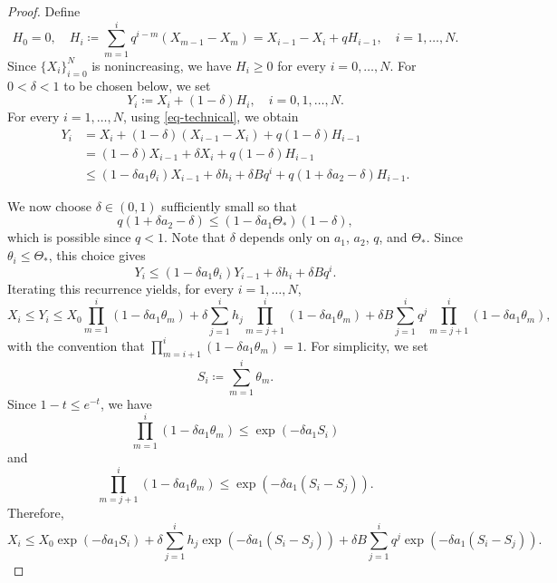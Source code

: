 \documentclass[10pt,a4paper]{amsart}
\begin{document}
\begin{proof}
Define
    \begin{equation*}
        H_0=0, \quad H_i \coloneqq \sum_{m=1}^iq^{i-m}(X_{m-1}-X_m)=X_{i-1}-X_i+qH_{i-1}, \quad i=1,\dots, N.
    \end{equation*}
Since $\{X_i\}_{i=0}^N$ is nonincreasing, we have $H_i \geq 0$ for every $i=0, \dots, N$. For $0<\delta<1$ to be chosen below, we set
    \begin{equation*}
        Y_i \coloneqq X_i+(1-\delta)H_i, \quad i=0, 1, \dots, N.
    \end{equation*}
For every $i=1, \dots, N$, using \eqref{eq-technical}, we obtain
    \begin{equation*}
    \begin{aligned}
        Y_i&=X_i+(1-\delta)(X_{i-1}-X_i)+q(1-\delta)H_{i-1}\\
        &=(1-\delta)X_{i-1}+\delta X_i+q(1-\delta)H_{i-1}\\
        &\leq (1-\delta a_1 \theta_i)X_{i-1}+\delta h_i+\delta B q^i+q(1+\delta a_2-\delta)H_{i-1}.
    \end{aligned}
    \end{equation*}


    We now choose $\delta \in (0, 1)$ sufficiently small so that
    \begin{equation*}
        q(1+\delta a_2-\delta) \leq (1-\delta a_1\Theta_{\ast})(1-\delta),
    \end{equation*}
    which is possible since $q<1$. Note that $\delta$ depends only on $a_1$, $a_2$, $q$, and $\Theta_\ast$. Since $\theta_i \leq \Theta_\ast$, this choice gives
    \begin{equation*}
        Y_i \leq (1-\delta a_1 \theta_i)Y_{i-1}+\delta h_i+\delta Bq^i.
    \end{equation*}
    Iterating this recurrence yields, for every $i=1, \dots, N$,
    \begin{equation*}
        X_i \leq Y_i \leq X_0 \prod_{m=1}^i (1-\delta a_1 \theta_m)+\delta \sum_{j=1}^i h_j \prod_{m=j+1}^i(1-\delta a_1 \theta_m)+\delta B \sum_{j=1}^i q^j \prod_{m=j+1}^i(1-\delta a_1 \theta_m),
    \end{equation*}
    with the convention that $\prod_{m=i+1}^i (1-\delta a_1 \theta_m)=1$.
    For simplicity, we set
    \begin{equation*}
        S_i \coloneqq \sum_{m=1}^i\theta_m.
    \end{equation*}
Since $1-t \leq e^{-t}$, we have
    \begin{equation*}
        \prod_{m=1}^i(1-\delta a_1 \theta_m) \leq \exp\left(-\delta a_1 S_i\right)
    \end{equation*}
    and
    \begin{equation*}
        \prod_{m=j+1}^i(1-\delta a_1 \theta_m) \leq \exp\left(-\delta a_1 (S_i-S_j)\right).
    \end{equation*}
Therefore,
    \begin{equation*}
    X_i \leq X_0 \exp\left( -\delta a_1 S_i \right) + \delta \sum_{j=1}^{i} h_j\exp\left(-\delta a_1 (S_i-S_j)\right) + \delta B \sum_{j=1}^i q^j \exp\left(-\delta a_1 (S_i-S_j)\right).
    \end{equation*}
    

\end{proof}
\end{document}
